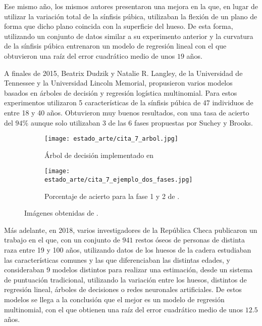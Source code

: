Ese mismo año, los mismos autores presentaron una mejora \cite{mejoraModelandoHuesos3D} en la que, en lugar de utilizar la variación total de la sínfisis púbica, utilizaban la flexión de un plano de forma que dicho plano coincida con la superficie del hueso. De esta forma, utilizando un conjunto de datos similar a su experimento anterior y la curvatura de la sínfisis púbica entrenaron un modelo de regresión lineal con el que obtuvieron una raíz del error cuadrático medio de unos $19$ años.

A finales de 2015, Beatrix Dudzik y Natalie R. Langley, de la Universidad de Tennessee y la Universidad Lincoln Memorial, propusieron \cite{componentBased} varios modelos basados en árboles de decisión y regresión logística multinomial. Para estos experimentos utilizaron 5 características de la sínfisis púbica de 47 individuos de entre 18 y 40 años. Obtuvieron muy buenos resultados, con una tasa de acierto del $94\%$ aunque solo utilizaban 3 de las 6 fases propuestas por Suchey y Brooks.

\begin{figure}[H]
	\centering
	\begin{subfigure}{.5\textwidth}
	  \centering
	  \texttt{[image: estado\_arte/cita\_7\_arbol.jpg]}
	  \caption{Árbol de decisión implementado en \cite{componentBased}}
	  \label{fig:arbol_c7}
	\end{subfigure}%
	\begin{subfigure}{.5\textwidth}
	  \centering
	  \texttt{[image: estado\_arte/cita\_7\_ejemplo\_dos\_fases.jpg]}
	  \caption{Porcentaje de acierto para la fase 1 y 2 de \cite{componentBased}.}
	  \label{fig:acierto_cita7}
	\end{subfigure}
	\caption{Imágenes obtenidas de \cite{componentBased}.}
	\label{fig:arboles_cita7}
\end{figure}



Más adelante, en 2018, varios investigadores de la República Checa publicaron un trabajo \cite{estimacionHuesosCadera} en el que, con un conjunto de $941$ restos óseos de personas de distinta raza entre 19 y 100 años, utilizando datos de los huesos de la cadera estudiaban las características comunes y las que diferenciaban las distintas edades, y consideraban 9 modelos distintos para realizar una estimación, desde un sistema de puntuación tradicional, utilizando la variación entre los huesos, distintos de regresión lineal, árboles de decisiones o redes neuronales artificiales. De estos modelos se llega a la conclusión que el mejor es un modelo de regresión multinomial, con el que obtienen una raíz del error cuadrático medio de unos $12.5$ años.

